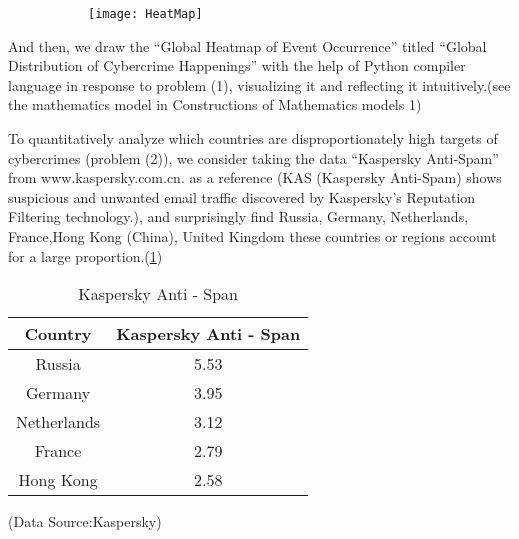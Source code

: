 \documentclass[12pt]{article}
\begin{document}
		\begin{figure}[H]
	
	\centering
	\begin{subfigure}
		\centering
		\texttt{[image: HeatMap]}
		\label{GettingHeatMap}
	\end{subfigure}
	
\end{figure}	
	
	And then, we draw the “Global Heatmap of Event Occurrence” titled “Global Distribution of Cybercrime Happenings” with the help of Python compiler language in response to problem (1), visualizing it and reflecting it intuitively.(see the mathematics model in Constructions of Mathematics models 1) 
	
	
	
	To quantitatively analyze which countries are disproportionately high targets of cybercrimes (problem (2)), we consider taking the data “Kaspersky Anti-Spam” from www.kaspersky.com.cn. as a reference (KAS (Kaspersky Anti-Spam) shows suspicious and unwanted email traffic discovered by Kaspersky’s Reputation Filtering technology.), and surprisingly find Russia, Germany, Netherlands, France,Hong Kong (China), United Kingdom these countries or regions account for a large proportion.(\cref{tab:sub1})
	

	\begin{table}[H]
		\centering
		\caption{Kaspersky Anti - Span}
		\label{tab:sub1}
	\begin{tabular}{|c|c|}
	
	\hline
	Country & Kaspersky Anti - Span \\
	\hline
	Russia & 5.53 \\
	\hline
	Germany & 3.95 \\
	\hline
	Netherlands & 3.12 \\
	\hline
	France & 2.79 \\
	\hline
	Hong Kong & 2.58 \\
	\hline
	
	\end{tabular}
	
	\end{table}
		\begin{center}
		(Data Source:Kaspersky)
	\end{center}
	
	
	
\end{document}
